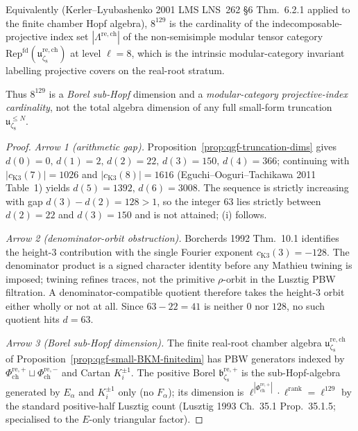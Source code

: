 \begin{theorem}
\begin{enumerate}[label=\textup{(\roman*)}]
\[ \]
 Equivalently (Kerler--Lyubashenko 2001 LMS LNS~262 \S6
 Thm.~6.2.1 applied to the finite chamber Hopf algebra), $8^{129}$ is
 the cardinality of the indecomposable-projective index set
 $|\Lambda^{\mathrm{re,ch}}|$ of the non-semisimple modular tensor
 category
 $\mathrm{Rep}^{\mathrm{fd}}(\mathfrak u_{\zeta_8}^{\mathrm{re,ch}})$
 at level $\ell=8$, which is the intrinsic modular-category
 invariant labelling projective covers on the real-root stratum.
\end{enumerate}
Thus $8^{129}$ is a \emph{Borel sub-Hopf} dimension and a
\emph{modular-category projective-index cardinality}, not the total
algebra dimension of any full small-form truncation
$\mathfrak u_{\zeta_8}^{\le N}$.
\end{theorem}

\begin{proof}
\emph{Arrow 1 (arithmetic gap).} Proposition~\ref{prop:qgf-truncation-dims}
gives $d(0)=0,\,d(1)=2,\,d(2)=22,\,d(3)=150,\,d(4)=366$; continuing
with $|c_{\mathrm K3}(7)|=1026$ and $|c_{\mathrm K3}(8)|=1616$
(Eguchi--Ooguri--Tachikawa 2011 Table~1) yields
$d(5)=1392,\,d(6)=3008$. The sequence is strictly increasing with gap
$d(3)-d(2)=128>1$, so the integer $63$ lies strictly between $d(2)=22$
and $d(3)=150$ and is not attained; (i) follows.

\emph{Arrow 2 (denominator-orbit obstruction).} Borcherds 1992
Thm.~10.1 identifies the height-$3$ contribution with the single
Fourier exponent \(c_{\mathrm K3}(3)=-128\). The denominator product
is a signed character identity before any Mathieu twining is imposed;
twining refines traces, not the primitive \(\rho\)-orbit in the
Lusztig PBW filtration. A denominator-compatible quotient therefore
takes the height-$3$ orbit either wholly or not at all. Since
$63-22=41$ is neither \(0\) nor \(128\), no such quotient hits
$d=63$.

\emph{Arrow 3 (Borel sub-Hopf dimension).} The finite real-root
chamber algebra
\(\mathfrak u_{\zeta_8}^{\mathrm{re},\mathrm{ch}}\) of
Proposition~\ref{prop:qgf-small-BKM-finitedim} has PBW generators
indexed by
\(\Phi^{\mathrm{re},+}_{\mathrm{ch}}\sqcup
\Phi^{\mathrm{re},-}_{\mathrm{ch}}\) and Cartan \(K_i^{\pm1}\).
The positive Borel
$\mathfrak b^{\mathrm{re},+}_{\zeta_8}$ is the sub-Hopf-algebra
generated by \(E_\alpha\) and \(K_i^{\pm 1}\) only (no \(F_\alpha\));
its dimension is
\(\ell^{|\Phi^{\mathrm{re},+}_{\mathrm{ch}}|}\cdot\ell^{\mathrm{rank}}
=\ell^{129}\) by the standard positive-half Lusztig count
(Lusztig 1993 Ch.~35.1 Prop.~35.1.5; specialised to the $E$-only
triangular factor).


\end{proof}
